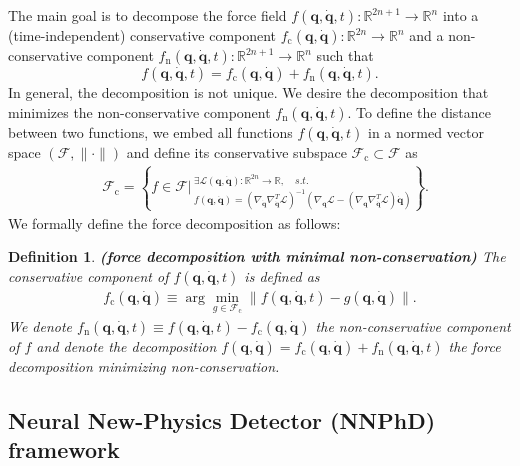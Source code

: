 \documentclass[aps,pre,reprint,superscriptaddress,nofootinbib,amsmath,amssymb]{revtex4-2}
\newcommand{\mat}[1]{\mathbf{#1}}
\newcommand{\q}{\mat{q}}
\newcommand{\qd}{\dot{\mat{q}}}
\newcommand{\lag}{\mathcal{L}}
\newtheorem{definition}{Definition}[section]
\def\beq#1{\begin{equation}\label{#1}}
\def\eeq{\end{equation}}
\begin{document}
The main goal is to decompose the force field $f(\q,\qd,t):\mathbb{R}^{2n+1}\to\mathbb{R}^{n}$ into a (time-independent) conservative component $f_{\mathrm{c}}(\q,\qd):\mathbb{R}^{2n}\to\mathbb{R}^{n}$ and a non-conservative component $f_{\mathrm{n}}(\q,\qd,t):\mathbb{R}^{2n+1}\to\mathbb{R}^{n}$ such that 
\beq{DecompositionEq}
f(\q,\qd,t)=f_{\mathrm{c}}(\q,\qd)+f_{\mathrm{n}}(\q,\qd,t).
\eeq
In general, the decomposition is not unique. We desire the decomposition that minimizes the non-conservative component $f_{\mathrm{n}}(\q,\qd,t)$. To define the distance between two functions, we embed all functions $f(\q,\qd,t)$ in a normed vector space $(\mathcal{F},\|\cdot\|)$ and define its conservative subspace $\mathcal{F}_{\mathrm{c}}\subset\mathcal{F}$ as
\begin{align*}
	&\mathcal{F}_{\mathrm{c}}=\left\{f\in\mathcal{F}\big|^{\ \exists \mathcal{L}(\q,\qd):\mathbb{R}^{2n}\rightarrow\mathbb{R}, \quad\textit{s.t.}}_{\ f(\q,\qd)=(\nabla_{\qd} \nabla_{\qd}^T\lag)^{-1}\left(\nabla_{\q}\lag-(\nabla_{\q}\nabla_{\qd}^T\lag)\qd\right)}\right\}.
\end{align*}
We formally define the force decomposition as follows:
\begin{definition} \textbf{(force decomposition with minimal non-conservation)} 
	{\normalfont The} conservative component {\normalfont of $f(\q,\qd,t)$ is defined as}
	\begin{align}\label{eq:non-conservation-minimization}
		f_{\mathrm{c}}(\q,\qd)\equiv\arg\min_{g\in\mathcal{F}_{\mathrm{c}}}\|f(\q,\qd,t)-g(\q,\qd)\|.
	\end{align} {\normalfont We denote $f_{\mathrm{n}}(\q,\qd,t)\equiv f(\q,\qd,t)-f_{\mathrm{c}}(\q,\qd)$ the} non-conservative component {\normalfont of $f$ and denote the decomposition $f(\q,\qd)=f_{\mathrm{c}}(\q,\qd)+f_{\mathrm{n}}(\q,\qd,t)$ the \textit{force decomposition minimizing non-conservation}.}
\end{definition}










\subsection{Neural New-Physics Detector (NNPhD) framework}\label{sec:nnphd}
\end{document}
